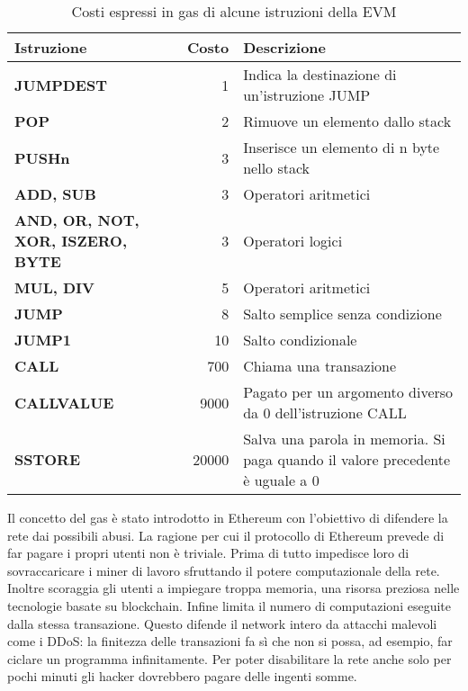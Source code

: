 \begin{table}[h]                        
\begin{center}  
\begin{tabular}{p{5cm}rp{6cm}}  

\hline \hline   %
Istruzione & Costo & Descrizione\\   %
\hline  %
\bf JUMPDEST & 1 & Indica la destinazione di un'istruzione JUMP\\
\bf POP & 2 & Rimuove un elemento dallo stack\\
\bf PUSHn & 3 & Inserisce un elemento di n byte nello stack\\
\bf ADD, SUB & 3 & Operatori aritmetici\\
\bf AND, OR, NOT, XOR, ISZERO, BYTE & 3 & Operatori logici\\
\bf MUL, DIV & 5 & Operatori aritmetici\\
\bf JUMP & 8 & Salto semplice senza condizione\\
\bf JUMP1 & 10 & Salto condizionale\\
\hline
\bf CALL & 700 & Chiama una transazione\\
\bf CALLVALUE & 9000 & Pagato per un argomento diverso da 0 dell'istruzione CALL\\
\bf SSTORE & 20000 & Salva una parola in memoria. Si paga quando il valore precedente è uguale a 0\\
\hline \hline
\end{tabular}
\caption[Costi delle istruzioni della EVM]{Costi espressi in gas di alcune istruzioni della EVM}\label{tab:gas-costs}
\end{center}
\end{table}

\indent  Il concetto del gas è stato introdotto in Ethereum con 
l'obiettivo di difendere la rete dai possibili abusi. La ragione per cui il protocollo di Ethereum prevede di far pagare i propri utenti non è triviale. Prima di tutto impedisce loro di sovraccaricare i miner di lavoro sfruttando il potere computazionale della rete. Inoltre scoraggia gli utenti a impiegare troppa memoria, una risorsa preziosa nelle tecnologie basate su blockchain. Infine limita il numero di computazioni eseguite dalla stessa transazione. Questo difende il network intero da attacchi malevoli come i DDoS: la finitezza delle transazioni fa sì che non si possa, ad esempio, far ciclare un programma infinitamente. Per poter disabilitare la rete anche solo per pochi minuti gli hacker dovrebbero pagare delle ingenti somme.\newline


